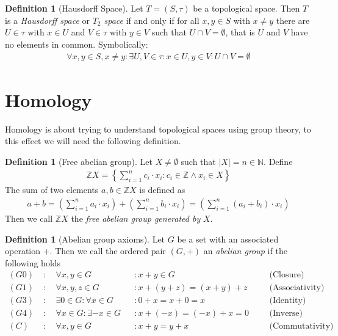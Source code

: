 \documentclass{article}
\theoremstyle{plain}
\theoremstyle{definition}
\newtheorem{definition}[theorem]{Definition}
\newcommand{\N}{\mathbb{N}}
\newcommand{\Z}{\mathbb{Z}}
\begin{document}
\begin{definition}[Hausdorff Space]
	Let $T=(S,\tau)$ be a topological space. Then $T$ is a \textit{Hausdorff 
	space} or \textit{$T_2$ space} if and only if for all $x,y\in S$ with
	$x\neq y$ there are $U\in\tau$ with $x\in U$ and $V\in\tau$ with $y\in V$
	such that $U\cap V=\emptyset$, that is $U$ and $V$ have no elements in
	common. Symbolically:
	\begin{equation}
	\begin{aligned}
		\forall x,y\in S, x\neq y:\exists U,V\in\tau:x\in U,y\in V: U\cap
		V=\emptyset
	\end{aligned}
	\end{equation}
\end{definition}
\newpage
\section{Homology}
Homology is about trying to understand topological spaces using group theory, to
this effect we will need the following definition.
\begin{definition}[Free abelian group]\label{Free abelian group}
Let $X\neq \emptyset$ such that $\left|X\right|=n\in \N$. Define
\begin{equation}
\begin{aligned}
	\Z X = \left\{\sum_{i=1}^n c_i\cdot x_i:c_i \in \Z \land x_i \in X\right\}
\end{aligned}
\end{equation}
The sum of two elements $a,b\in \Z X$ is defined as
\begin{equation}
\begin{aligned}
	a+b = \left(\sum_{i=1}^n a_i\cdot x_i\right)+
	      \left(\sum_{i=1}^n b_i\cdot x_i\right)
		= \left(\sum_{i=1}^n (a_i+b_i)\cdot x_i\right)
\end{aligned}
\end{equation}
Then we call $\Z X$ the \textit{free abelian group generated by} $X$.
\end{definition}
\begin{definition}[Abelian group axioms]\label{Abelian group}
Let $G$ be a set with an associated operation $+$. Then we call the ordered pair
$(G,+)$ an \textit{abelian group} if the following holds
	\begin{equation*}
	\begin{aligned}
		(G0)\; &:\quad \forall x,y\in G &&: x+y\in G 
		&&&\text{(Closure)}\\
		(G1)\; &:\quad \forall x,y,z\in G &&: x+(y+z)=(x+y)+z
		&&&\text{(Associativity)}\\
		(G3)\; &:\quad \exists 0\in G:\forall x\in G &&: 0+x=x+0=x
		&&&\text{(Identity)}\\
		(G4)\; &:\quad \forall x\in G:\exists -x\in G &&: x+(-x)=(-x)+x=0
		&&&\text{(Inverse)}\\
		(C)\; &:\quad \forall x,y\in G&&: x+y=y+x
		&&&\text{(Commutativity)}\\
	\end{aligned}
	\end{equation*}
\end{definition}
\end{document}
